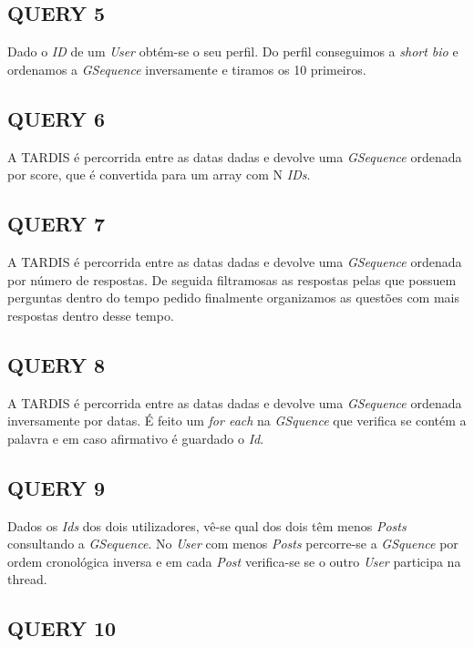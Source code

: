 \documentclass[letterpaper, 10 pt, conference]{IEEEtran}  %
\begin{document}
\subsection{QUERY 5}

Dado o \textit{ID} de um \textit{User} obtém-se o seu perfil. Do perfil conseguimos a \textit{short bio} e ordenamos a \textit{GSequence} inversamente e tiramos os 10 primeiros.

\subsection{QUERY 6}

A TARDIS é percorrida entre as datas dadas e devolve uma \textit{GSequence} ordenada por score, que é convertida para um array com N \textit{IDs}.

\subsection{QUERY 7}

A TARDIS é percorrida entre as datas dadas e devolve uma \textit{GSequence} ordenada por número de respostas. De seguida filtramosas as respostas pelas que  possuem perguntas dentro do tempo pedido finalmente organizamos as questões com mais respostas dentro desse tempo.
\subsection{QUERY 8}

A TARDIS é percorrida entre as datas dadas e devolve uma \textit{GSequence} ordenada inversamente por datas. É feito um \textit{for each} na \textit{GSquence} que verifica se contém a palavra e em caso afirmativo é guardado o \textit{Id}.

\subsection{QUERY 9}

Dados os \textit{Ids} dos dois utilizadores, vê-se qual dos dois têm menos \textit{Posts} consultando a \textit{GSequence}. No \textit{User} com menos \textit{Posts} percorre-se a \textit{GSquence} por ordem cronológica inversa e em cada \textit{Post} verifica-se se o outro \textit{User} participa na thread.

\subsection{QUERY 10}
\end{document}
